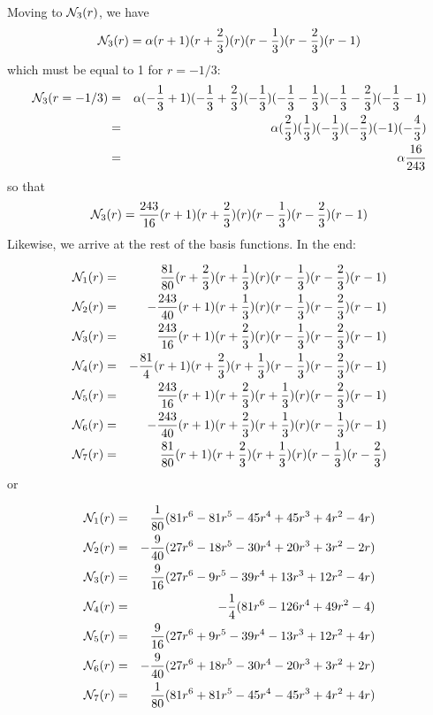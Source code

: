 Moving to ${\mathcal{N}}_3(r)$, we have
\[
{\mathcal{N}}_3(r)= \alpha(r+1)(r+\frac23)(r)(r-\frac13)(r-\frac23)(r-1)
\]
which must be equal to 1 for $r=-1/3$:
\begin{eqnarray}
{\mathcal{N}}_3(r=-1/3)
&=& \alpha(-\frac13+1)(-\frac13+\frac23)(-\frac13)(-\frac13-\frac13)(-\frac13-\frac23)(-\frac13-1) \nonumber\\
&=& \alpha(\frac23)(\frac13)(-\frac13)(-\frac23)(-1)(-\frac43) \nonumber\\
&=& \alpha \frac{16}{243}
\end{eqnarray}
so that 
\[
{\mathcal{N}}_3(r)= \frac{243}{16}(r+1)(r+\frac23)(r)(r-\frac13)(r-\frac23)(r-1)
\]
Likewise, we arrive at the rest of the basis functions. In the end:

\begin{eqnarray}
{\mathcal{N}}_1(r) &=& \frac{81}{80}(r+\frac23)(r+\frac13)(r)(r-\frac13)(r-\frac23)(r-1) \nonumber\\
{\mathcal{N}}_2(r) &=& -\frac{243}{40}(r+1)(r+\frac13)(r)(r-\frac13)(r-\frac23)(r-1) \nonumber\\
{\mathcal{N}}_3(r) &=& \frac{243}{16}(r+1)(r+\frac23)(r)(r-\frac13)(r-\frac23)(r-1) \nonumber\\
{\mathcal{N}}_4(r) &=& -\frac{81}{4}(r+1)(r+\frac23)(r+\frac13)(r-\frac13)(r-\frac23)(r-1) \nonumber\\
{\mathcal{N}}_5(r) &=& \frac{243}{16}(r+1)(r+\frac23)(r+\frac13)(r)(r-\frac23)(r-1) \nonumber\\
{\mathcal{N}}_6(r) &=& -\frac{243}{40}(r+1)(r+\frac23)(r+\frac13)(r)(r-\frac13)(r-1) \nonumber\\
{\mathcal{N}}_7(r) &=& \frac{81}{80}(r+1)(r+\frac23)(r+\frac13)(r)(r-\frac13)(r-\frac23)
\end{eqnarray}
or 

\begin{mdframed}[backgroundcolor=blue!5]
\begin{eqnarray}
{\mathcal{N}}_1(r) &=& \frac{1}{80}(81r^6-81r^5-45r^4+45r^3+4r^2-4r) \nonumber\\
{\mathcal{N}}_2(r) &=& -\frac{9}{40}(27r^6 -18r^5 -30r^4 +20r^3 +3r^2 -2r) \nonumber\\ 
{\mathcal{N}}_3(r) &=& \frac{9}{16} (27r^6 -9r^5 -39r^4 +13r^3 +12r^2 -4r) \nonumber\\ 
{\mathcal{N}}_4(r) &=& -\frac{1}{4} (81r^6 - 126r^4+49r^2 -4) \nonumber\\ 
{\mathcal{N}}_5(r) &=& \frac{9}{16} (27r^6 +9r^5 -39r^4 -13r^3 +12r^2 +4r) \nonumber\\ 
{\mathcal{N}}_6(r) &=& -\frac{9}{40}(27r^6 +18r^5 -30r^4 -20r^3 +3r^2 +2r) \nonumber\\ 
{\mathcal{N}}_7(r) &=&  \frac{1}{80}(81r^6+81r^5-45r^4-45r^3+4r^2+4r) 
\end{eqnarray}
\end{mdframed}


